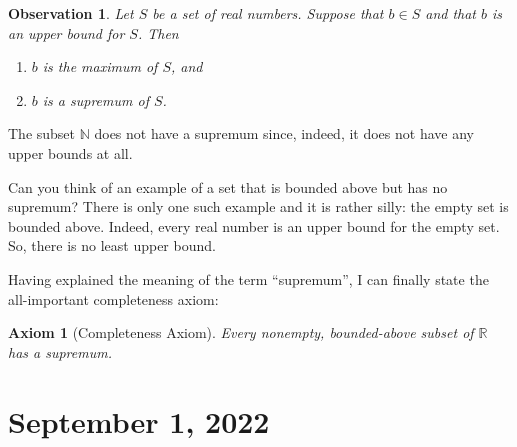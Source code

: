 \documentclass[12pt]{amsart}
\newcommand{\R}{{\mathbb{R}}}
\newcommand{\N}{\mathbb{N}}
\numberwithin{equation}{section}
\theoremstyle{plain} %
\newtheorem{obs}[equation]{Observation}
\newtheorem*{question}{Question}
\newtheorem*{axiom*}{Axiom}
\newcommand{\Sept}[1]{\section{September #1, 2022}}
\theoremstyle{definition}
\theoremstyle{remark}
\begin{document}
\begin{obs} Let $S$ be a set of real numbers. Suppose that $b\in S$ and that $b$ is an upper bound for $S$. Then
\begin{enumerate}
\item $b$ is the maximum of $S$, and 
\item $b$ is a supremum of $S$.
\end{enumerate}
\end{obs}

The subset $\N$ does not have a supremum since, indeed, it does not have any upper bounds at all.




Can you think of an example of a set that is bounded above but has no supremum? There is only one such example and it is rather silly: the empty set is
bounded above. Indeed, every real number is an upper bound for the empty set. So, there is no least upper bound.

Having explained the meaning of the term ``supremum'', I can finally state the all-important completeness axiom:


\begin{axiom*}[Completeness Axiom] Every nonempty, bounded-above subset of $\R$ has a supremum.
\end{axiom*}


\Sept{1}
\end{document}
